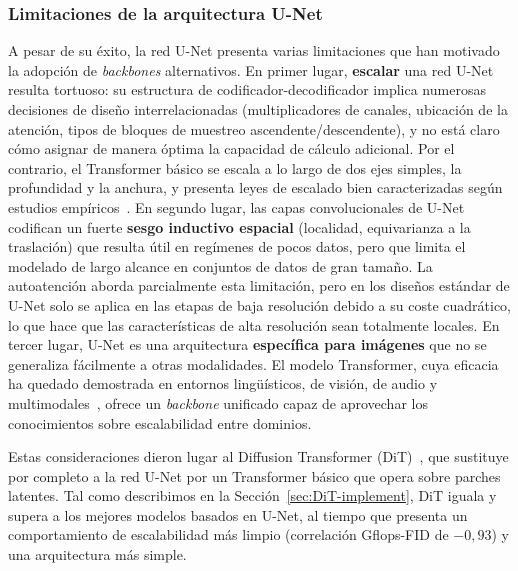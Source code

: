 \documentclass[../../book-main_es.tex]{subfiles}
\begin{document}
\subsubsection{Limitaciones de la arquitectura U-Net}
\label{sec:unet-limitations}

A pesar de su éxito, la red U-Net presenta varias limitaciones que han motivado la adopción 
de \textit{backbones} alternativos. En primer lugar, \textbf{escalar} una red U-Net resulta tortuoso: 
su estructura de codificador-decodificador implica numerosas decisiones de diseño interrelacionadas 
(multiplicadores de canales, ubicación de la atención, tipos de bloques de muestreo 
ascendente/descendente), y no está claro cómo asignar de manera óptima la capacidad de cálculo 
adicional. Por el contrario, el Transformer básico se escala a lo largo de dos ejes simples, la 
profundidad y la anchura, y presenta leyes de escalado bien caracterizadas según estudios 
empíricos~\citep{kaplan2020scaling}. En segundo lugar, las capas convolucionales de U-Net 
codifican un fuerte \textbf{sesgo inductivo espacial} (localidad, equivarianza a la traslación) 
que resulta útil en regímenes de pocos datos, pero que limita el modelado de largo alcance en 
conjuntos de datos de gran tamaño. La autoatención aborda parcialmente esta limitación, pero en 
los diseños estándar de U-Net solo se aplica en las etapas de baja resolución debido a su coste 
cuadrático, lo que hace que las características de alta resolución sean totalmente locales. En 
tercer lugar, U-Net es una arquitectura \textbf{específica para imágenes} que no se generaliza 
fácilmente a otras modalidades. El modelo Transformer, cuya eficacia ha quedado demostrada en 
entornos lingüísticos, de visión, de audio y multimodales~\citep{vaswani2017attention}, ofrece un 
\textit{backbone} unificado capaz de aprovechar los conocimientos sobre escalabilidad entre dominios.

Estas consideraciones dieron lugar al Diffusion Transformer (DiT)~\citep{peebles2023scalable}, que 
sustituye por completo a la red U-Net por un Transformer básico que opera sobre parches latentes. 
Tal como describimos en la Sección~\ref{sec:DiT-implement}, DiT iguala y supera a los mejores modelos 
basados en U-Net, al tiempo que presenta un comportamiento de escalabilidad más limpio (correlación 
Gflops-FID de $-0,93$) y una arquitectura más simple.
\end{document}
